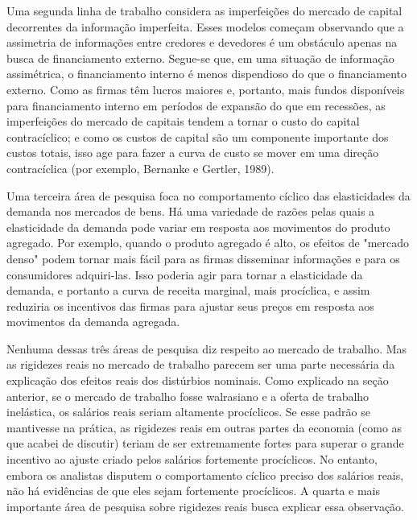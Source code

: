 \documentclass[12pt]{article}
\begin{document}
Uma segunda linha de trabalho considera as imperfeições do mercado de capital decorrentes da informação imperfeita. Esses modelos começam observando que a assimetria de informações entre credores e devedores é um obstáculo apenas na busca de financiamento externo. Segue-se que, em uma situação de informação assimétrica, o financiamento interno é menos dispendioso do que o financiamento externo. Como as firmas têm lucros maiores e, portanto, mais fundos disponíveis para financiamento interno em períodos de expansão do que em recessões, as imperfeições do mercado de capitais tendem a tornar o custo do capital contracíclico; e como os custos de capital são um componente importante dos custos totais, isso age para fazer a curva de custo se mover em uma direção contracíclica (por exemplo, Bernanke e Gertler, 1989).

Uma terceira área de pesquisa foca no comportamento cíclico das elasticidades da demanda nos mercados de bens. Há uma variedade de razões pelas quais a elasticidade da demanda pode variar em resposta aos movimentos do produto agregado. Por exemplo, quando o produto agregado é alto, os efeitos de "mercado denso" podem tornar mais fácil para as firmas disseminar informações e para os consumidores adquiri-las. Isso poderia agir para tornar a elasticidade da demanda, e portanto a curva de receita marginal, mais procíclica, e assim reduziria os incentivos das firmas para ajustar seus preços em resposta aos movimentos da demanda agregada.

Nenhuma dessas três áreas de pesquisa diz respeito ao mercado de trabalho. Mas as rigidezes reais no mercado de trabalho parecem ser uma parte necessária da explicação dos efeitos reais dos distúrbios nominais. Como explicado na seção anterior, se o mercado de trabalho fosse walrasiano e a oferta de trabalho inelástica, os salários reais seriam altamente procíclicos. Se esse padrão se mantivesse na prática, as rigidezes reais em outras partes da economia (como as que acabei de discutir) teriam de ser extremamente fortes para superar o grande incentivo ao ajuste criado pelos salários fortemente procíclicos. No entanto, embora os analistas disputem o comportamento cíclico preciso dos salários reais, não há evidências de que eles sejam fortemente procíclicos. A quarta e mais importante área de pesquisa sobre rigidezes reais busca explicar essa observação.
\end{document}
